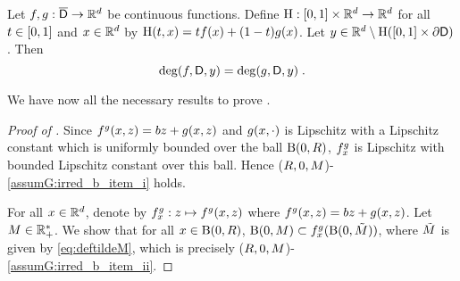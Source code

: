 \begin{proposition}
  \label{theo:deg_modif}
  Let $f,g : \overline{\mathsf{D}} \to \mathbb{R}^d$ be  continuous functions. Define
  $\mathrm{H}:\left[0,1\right] \times \mathbb{R}^d \to \mathbb{R}^d$ for all $t \in
  \left[0,1\right]$ and $x \in \mathbb{R}^d$ by $\mathrm{H}(t,x) = t f(x) +
  (1-t)g(x)$. Let $y \in \mathbb{R}^d \setminus \mathrm{H}(\left[0,1\right] \times \partial \mathsf{D})$. Then
\begin{equation}
  \deg(f,\mathsf{D},y) =  \deg(g,\mathsf{D},y) \;.
\end{equation}
\end{proposition}
We have now all the necessary results to prove .
\begin{proof}[Proof of ]
Since $f^{g}(x,z) =  b z + g(x,z)$ and $g(x,\cdot)$ is Lipschitz with a Lipschitz constant which is uniformly bounded over the ball $\operatorname{B}(0,R)$,  $f^{g}_x$ is Lipschitz with bounded Lipschitz constant over this ball. Hence ($R,0,M$)-\ref{assumG:irred_b_item_i} holds.

  For all $x \in \mathbb{R}^d$, denote by $f^{g}_x : z \mapsto f^{g}(x,z)$ where $f^{g}(x,z)=bz + g(x,z)$.
  Let $M \in \mathbb{R}_+^*$. We show that for all $x \in
  \operatorname{B}(0,R)$, $\operatorname{B}(0,M) \subset
  f^{g}_x(\operatorname{B}(0,\tilde{M}))$, where $\tilde{M}$ is given by
  \eqref{eq:deftildeM}, which is precisely
  ($R,0,M$)-\ref{assumG:irred_b_item_ii}.


\end{proof}
